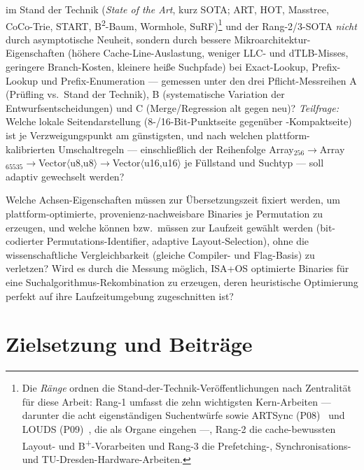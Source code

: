 \begin{description}
  im Stand der Technik (\emph{State of the Art}, kurz SOTA\@; ART, HOT, Masstree, CoCo-Trie, START,
  B\textsuperscript{2}-Baum, Wormhole,
  SuRF)\footnote{Die \emph{Ränge} ordnen die Stand-der-Technik-Veröffentlichungen nach Zentralität für diese Arbeit: Rang-1 umfasst die zehn wichtigsten Kern-Arbeiten --- darunter die acht eigenständigen Suchentwürfe sowie ARTSync (P08)~\cite{leis2016olc} und LOUDS (P09)~\cite{jacobson1989louds}, die als Organe eingehen ---, Rang-2 die cache-bewussten Layout- und B\textsuperscript{+}-Vorarbeiten und Rang-3 die Prefetching-, Synchronisations- und TU-Dresden-Hardware-Arbeiten.}
  und der Rang-2/3-SOTA \emph{nicht} durch asymptotische Neuheit, sondern durch bessere
  Mikroarchitektur-Eigenschaften (höhere Cache-Line-Auslastung, weniger LLC- und dTLB-Misses,
  geringere Branch-Kosten, kleinere heiße Suchpfade) bei Exact-Lookup, Prefix-Lookup und
  Prefix-Enumeration --- gemessen unter den drei Pflicht-Messreihen A (Prüfling vs.\ Stand der
  Technik), B (systematische Variation der Entwurfsentscheidungen) und C (Merge/Regression alt gegen
  neu)? \emph{Teilfrage:} Welche lokale Seitendarstellung (8-/16-Bit-Punktseite gegenüber
  -Kompaktseite) ist je Verzweigungspunkt am günstigsten, und nach welchen plattform-kalibrierten
  Umschaltregeln --- einschließlich der Reihenfolge
  Array$_{256}\to$Array$_{65535}\to$Vector$\langle$u8,u8$\rangle\to$Vector$\langle$u16,u16$\rangle$
  je Füllstand und Suchtyp --- soll adaptiv gewechselt werden?
  \item[FF4 (Compile-Time vs.\ Laufzeit)] Welche Achsen-Eigenschaften müssen zur Übersetzungszeit
  fixiert werden, um plattform-optimierte, provenienz-nachweisbare Binaries je Permutation zu
  erzeugen, und welche können bzw.\ müssen zur Laufzeit gewählt werden (bit-codierter
  Permutations-Identifier, adaptive Layout-Selection), ohne die wissenschaftliche Vergleichbarkeit
  (gleiche Compiler- und Flag-Basis) zu verletzen? Wird es durch die Messung möglich, ISA+OS
  optimierte Binaries für eine Suchalgorithmus-Rekombination zu erzeugen, deren heuristische
  Optimierung perfekt auf ihre Laufzeitumgebung zugeschnitten ist?
\end{description}

\section{Zielsetzung und Beiträge}\label{sec:contributions}

